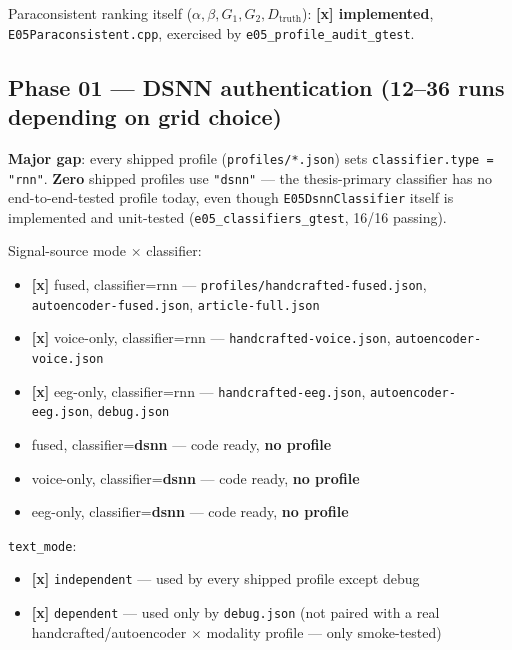 Paraconsistent ranking itself ($\alpha,\beta,G_1,G_2,D_{\text{truth}}$): \textbf{[x] implemented},
\texttt{E05Paraconsistent.cpp}, exercised by \texttt{e05\_profile\_audit\_gtest}.

\subsection*{Phase 01 --- DSNN authentication (12--36 runs depending on grid choice)}

\textbf{Major gap}: every shipped profile (\texttt{profiles/*.json}) sets
\texttt{classifier.type = "rnn"}. \textbf{Zero} shipped profiles use \texttt{"dsnn"} --- the
thesis-primary classifier has no end-to-end-tested profile today, even though \texttt{E05DsnnClassifier}
itself is implemented and unit-tested (\texttt{e05\_classifiers\_gtest}, 16/16 passing).

Signal-source mode $\times$ classifier:
\begin{itemize}
    \item[$\blacksquare$] \textbf{[x]} fused, classifier=rnn --- \texttt{profiles/handcrafted-fused.json},
    \texttt{autoencoder-fused.json}, \texttt{article-full.json}
    \item[$\blacksquare$] \textbf{[x]} voice-only, classifier=rnn --- \texttt{handcrafted-voice.json},
    \texttt{autoencoder-voice.json}
    \item[$\blacksquare$] \textbf{[x]} eeg-only, classifier=rnn --- \texttt{handcrafted-eeg.json},
    \texttt{autoencoder-eeg.json}, \texttt{debug.json}
    \item[$\square$] fused, classifier=\textbf{dsnn} --- code ready, \textbf{no profile}
    \item[$\square$] voice-only, classifier=\textbf{dsnn} --- code ready, \textbf{no profile}
    \item[$\square$] eeg-only, classifier=\textbf{dsnn} --- code ready, \textbf{no profile}
\end{itemize}

\texttt{text\_mode}:
\begin{itemize}
    \item[$\blacksquare$] \textbf{[x]} \texttt{independent} --- used by every shipped profile except debug
    \item[$\blacksquare$] \textbf{[x]} \texttt{dependent} --- used only by \texttt{debug.json}
    (not paired with a real handcrafted/autoencoder $\times$ modality profile --- only smoke-tested)
\end{itemize}

